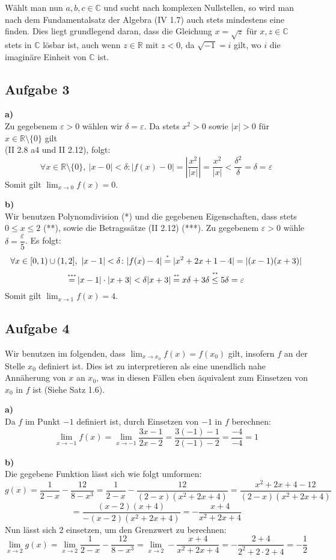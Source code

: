 \documentclass[a4paper,graphics,11pt]{article}
\newcommand{\aufgabe}[1]{\subsection*{Aufgabe #1}}
\newcommand{\up}[2]{\mathrel{\overset{\makebox[0pt]{\mbox{\normalfont\tiny #2}}}{#1}}}
\begin{document}
Wählt man nun $a,b,c \in \mathbb{C}$ und sucht nach komplexen Nullstellen,
so wird man nach dem Fundamentalsatz der Algebra (IV 1.7) auch stets mindestens eine finden.
Dies liegt grundlegend daran, dass die Gleichung $x = \sqrt{z}$ für $x,z \in \mathbb{C}$
stets in $\mathbb{C}$ lösbar ist, auch wenn $z \in \mathbb{R}$ mit $z < 0$, da $\sqrt{-1} = i$
gilt, wo $i$ die imaginäre Einheit von $\mathbb{C}$ ist.


\aufgabe{3}
\textbf{a)}\\
Zu gegebenem $\varepsilon > 0$ wählen wir $\delta = \varepsilon$. Da stets
$x^2 > 0$  sowie $|x| > 0$ für $x \in \mathbb{R}\setminus\{0\}$ gilt\\
(II 2.8 a4 und II 2.12), folgt:
$$
    \forall x \in \mathbb{R}\setminus \{0\},\ |x-0| < \delta \colon
    |f(x)-0| = \left|\frac{x^2}{|x|}\right| = \frac{x^2}{|x|} < \frac{\delta^2}{\delta} 
    = \delta = \varepsilon
$$
Somit gilt $\lim_{x \to 0}\limits f(x) = 0$.

\textbf{b)}\\
Wir benutzen Polynomdivision (*) und die gegebenen Eigenschaften, dass stets $0\leq x \leq 2$ (**),
sowie die Betragssätze (II 2.12) (***).
Zu gegebenem $\varepsilon > 0$ wähle $\delta = \dfrac{\varepsilon}{5}$. Es folgt:
$$
    \forall x \in [0,1)\cup(1,2],\ |x-1| < \delta \colon
    |f(x) - 4|
    \up{=}{*} |x^2+2x+1 - 4|
    = |(x-1)(x+3)|
$$$$
    \up{=}{***} |x-1|\cdot|x+3|
    < \delta|x+3|
    \up{=}{**} x\delta + 3\delta
    \up{\leq}{**} 5\delta
    = \varepsilon
$$
Somit gilt $\lim_{x \to 1}\limits f(x) = 4$.
\aufgabe{4}
Wir benutzen im folgenden, dass $\lim_{x \to x_0}\limits f(x) = f(x_0)$ gilt, insofern $f$ an
der Stelle $x_0$ definiert ist. Dies ist zu interpretieren als eine unendlich nahe
Annäherung von $x$ an $x_0$, was in diesen Fällen eben äquivalent zum Einsetzen von $x_0$ in
$f$ ist (Siehe Satz 1.6).

\textbf{a)}\\
Da $f$ im Punkt $-1$ definiert ist, durch Einsetzen von $-1$ in $f$ berechnen:
$$
    \lim_{x \to -1} f(x)
    = \lim_{x \to -1} \frac{3x-1}{2x-2}
    = \frac{3(-1)-1}{2(-1)-2} 
    = \frac{-4}{-4}
    = 1
$$

\textbf{b)}\\
Die gegebene Funktion lässt sich wie folgt umformen:
$$
    g(x) = \frac{1}{2-x} - \frac{12}{8-x^3}
    = \frac{1}{2-x} - \frac{12}{(2-x)(x^2+2x+4)} 
    = \frac{x^2+2x+4-12}{(2-x)(x^2+2x+4)}
$$$$
    = \frac{(x-2)(x+4)}{-(x-2)(x^2+2x+4)}
    = -\frac{x+4}{x^2+2x+4}
$$
Nun lässt sich 2 einsetzen, um den Grenzwert zu berechnen:
$$
    \lim_{x \to 2} g(x)
    = \lim_{x \to 2} \frac{1}{2-x} - \frac{12}{8-x^3}
    = \lim_{x \to 2} -\frac{x+4}{x^2+2x+4}
    = - \frac{2+4}{2^2+2\cdot 2 +4}
    = -\frac{1}{2}
$$
\end{document}
